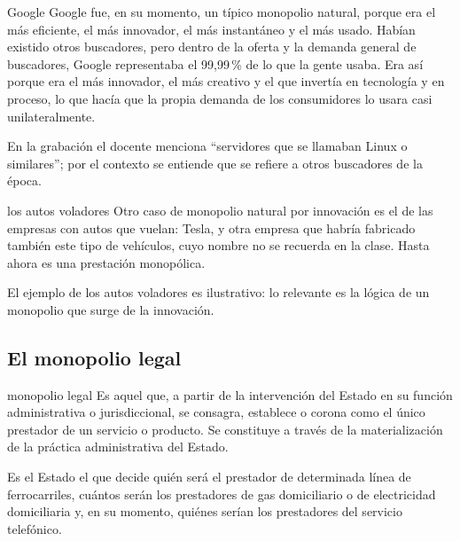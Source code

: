 \documentclass[12pt,oneside]{book}
\begin{document}
\begin{example}{Google}
Google fue, en su momento, un t\'ipico monopolio natural, porque era el m\'as eficiente, el m\'as innovador, el m\'as instant\'aneo y el m\'as usado. Hab\'ian existido otros buscadores, pero dentro de la oferta y la demanda general de buscadores, Google representaba el 99,99\,\% de lo que la gente usaba. Era as\'i porque era el m\'as innovador, el m\'as creativo y el que invert\'ia en tecnolog\'ia y en proceso, lo que hac\'ia que la propia demanda de los consumidores lo usara casi unilateralmente.
\end{example}

\begin{note}
En la grabaci\'on el docente menciona ``servidores que se llamaban Linux o similares''; por el contexto se entiende que se refiere a otros buscadores de la \'epoca.
\end{note}

\begin{example}{los autos voladores}
Otro caso de monopolio natural por innovaci\'on es el de las empresas con autos que vuelan: Tesla, y otra empresa que habr\'ia fabricado tambi\'en este tipo de veh\'iculos, cuyo nombre no se recuerda en la clase. Hasta ahora es una prestaci\'on monop\'olica.%
\end{example}

\begin{note}
El ejemplo de los autos voladores es ilustrativo: lo relevante es la l\'ogica de un monopolio que surge de la innovaci\'on.
\end{note}

\subsection{El monopolio legal}

\begin{definition}{monopolio legal}
Es aquel que, a partir de la intervenci\'on del Estado en su funci\'on administrativa o jurisdiccional, se consagra, establece o corona como el \'unico prestador de un servicio o producto. Se constituye a trav\'es de la materializaci\'on de la pr\'actica administrativa del Estado.
\end{definition}

Es el Estado el que decide qui\'en ser\'a el prestador de determinada l\'inea de ferrocarriles, cu\'antos ser\'an los prestadores de gas domiciliario o de electricidad domiciliaria y, en su momento, qui\'enes ser\'ian los prestadores del servicio telef\'onico.
\end{document}
